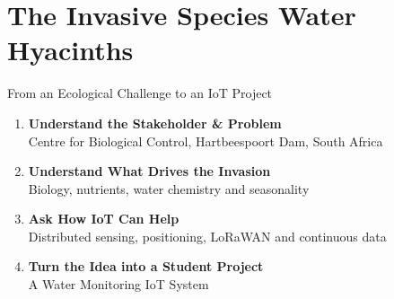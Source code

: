 \def\insertshortsection{Thematic Focus for 2024 \& 2025}
\section[withsectionpage]{The Invasive Species Water Hyacinths}

\begin{frame}{From an Ecological Challenge to an IoT Project}
\begin{enumerate}
    \item \textbf{Understand the Stakeholder \& Problem}\\
          Centre for Biological Control, Hartbeespoort Dam, South Africa
    \item \textbf{Understand What Drives the Invasion}\\
          Biology, nutrients, water chemistry and seasonality
    \item \textbf{Ask How IoT Can Help}\\
          Distributed sensing, positioning, LoRaWAN and continuous data
    \item \textbf{Turn the Idea into a Student Project}\\
          A Water Monitoring IoT System
\end{enumerate}
\end{frame}
